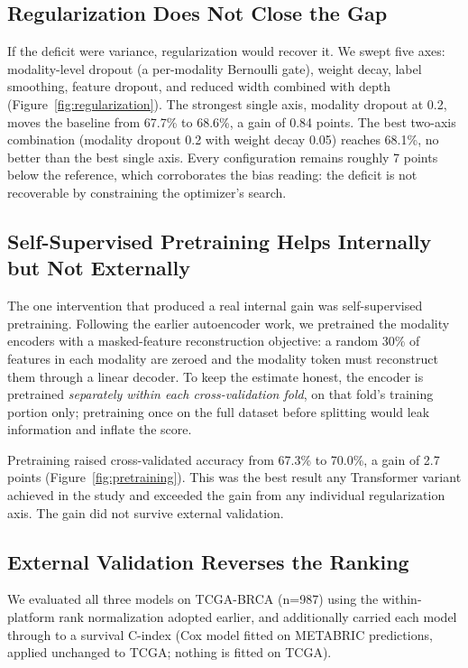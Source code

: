 \documentclass[11pt,a4paper]{article}
\begin{document}
\subsection{Regularization Does Not Close the Gap}
\label{sec:route_a_reg}

If the deficit were variance, regularization would recover it. We swept five axes: modality-level
dropout (a per-modality Bernoulli gate), weight decay, label smoothing, feature dropout, and
reduced width combined with depth (Figure~\ref{fig:regularization}). The strongest single axis,
modality dropout at 0.2, moves the baseline from 67.7\% to 68.6\%, a gain of 0.84 points. The
best two-axis combination (modality dropout 0.2 with weight decay 0.05) reaches 68.1\%, no better
than the best single axis. Every configuration remains roughly 7 points below the reference,
which corroborates the bias reading: the deficit is not recoverable by constraining the
optimizer's search.

\subsection{Self-Supervised Pretraining Helps Internally but Not Externally}
\label{sec:route_a_pretrain}

The one intervention that produced a real internal gain was self-supervised pretraining.
Following the earlier autoencoder work, we pretrained the modality encoders with a
masked-feature reconstruction objective: a random 30\% of features in each modality are zeroed
and the modality token must reconstruct them through a linear decoder. To keep the estimate
honest, the encoder is pretrained \emph{separately within each cross-validation fold}, on that
fold's training portion only; pretraining once on the full dataset before splitting would leak
information and inflate the score.

Pretraining raised cross-validated accuracy from 67.3\% to 70.0\%, a gain of 2.7 points
 (Figure~\ref{fig:pretraining}). This was the best result any Transformer variant achieved in
the study and exceeded the gain from any individual regularization axis. The gain did not survive external
validation.

\subsection{External Validation Reverses the Ranking}
\label{sec:route_a_tcga}

We evaluated all three models on TCGA-BRCA (n=987) using the within-platform rank normalization
adopted earlier, and additionally carried each model through to a survival C-index (Cox model
fitted on METABRIC predictions, applied unchanged to TCGA; nothing is fitted on TCGA).
\end{document}
